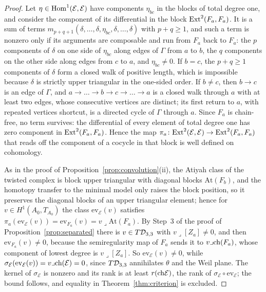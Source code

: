 \begin{proof}
Let $\eta\in\mathrm{Hom}^{1}(\mathcal{E},\mathcal{E})$ have components $\eta_{bc}$ in the blocks of total degree one, and consider the component of its differential in the block $\mathrm{Ext}^{2}(F_{a},F_{a})$. It is a sum of terms $m_{p+q+1}(\delta,\dots,\delta,\eta_{bc},\delta,\dots,\delta)$ with $p+q\ge1$, and such a term is nonzero only if its arguments are composable and run from $F_{a}$ back to $F_{a}$: the $p$ components of $\delta$ on one side of $\eta_{bc}$ along edges of $\Gamma$ from $a$ to $b$, the $q$ components on the other side along edges from $c$ to $a$, and $\eta_{bc}\ne0$. If $b=c$, the $p+q\ge1$ components of $\delta$ form a closed walk of positive length, which is impossible because $\delta$ is strictly upper triangular in the one-sided order. If $b\ne c$, then $b\to c$ is an edge of $\Gamma$, and $a\to\dots\to b\to c\to\dots\to a$ is a closed walk through $a$ with at least two edges, whose consecutive vertices are distinct; its first return to $a$, with repeated vertices shortcut, is a directed cycle of $\Gamma$ through $a$. Since $F_{a}$ is chain-free, no term survives: the differential of every element of total degree one has zero component in $\mathrm{Ext}^{2}(F_{a},F_{a})$. Hence the map $\pi_{a}\colon\mathrm{Ext}^{2}(\mathcal{E},\mathcal{E})\to\mathrm{Ext}^{2}(F_{a},F_{a})$ that reads off the component of a cocycle in that block is well defined on cohomology.

As in the proof of Proposition~\ref{prop:convolution}(ii), the Atiyah class of the twisted complex is block upper triangular with diagonal blocks $\mathrm{At}(F_{b})$, and the homotopy transfer to the minimal model only raises the block position, so it preserves the diagonal blocks of an upper triangular element; hence for $v\in H^{1}(A_{0},T_{A_{0}})$ the class $\mathrm{ev}_{\mathcal{E}}(v)$ satisfies $\pi_{a}(\mathrm{ev}_{\mathcal{E}}(v))=\mathrm{ev}_{F_{a}}(v)=v\lrcorner\mathrm{At}(F_{a})$. By Step~3 of the proof of Proposition~\ref{prop:separated} there is $v\in T\mathcal{D}_{3,3}$ with $v\lrcorner[Z_{a}]\ne0$, and then $\mathrm{ev}_{F_{a}}(v)\ne0$, because the semiregularity map of $F_{a}$ sends it to $v\lrcorner\mathrm{ch}(F_{a})$, whose component of lowest degree is $v\lrcorner[Z_{a}]$. So $\mathrm{ev}_{\mathcal{E}}(v)\ne0$, while $\sigma_{\mathcal{E}}(\mathrm{ev}_{\mathcal{E}}(v))=v\lrcorner\mathrm{ch}(\mathcal{E})=0$, since $T\mathcal{D}_{3,3}$ annihilates $\theta$ and the Weil plane. The kernel of $\sigma_{\mathcal{E}}$ is nonzero and its rank is at least $r(\mathrm{ch}\mathcal{E})$, the rank of $\sigma_{\mathcal{E}}\circ\mathrm{ev}_{\mathcal{E}}$; the bound follows, and equality in Theorem~\ref{thm:criterion} is excluded.
\end{proof}

